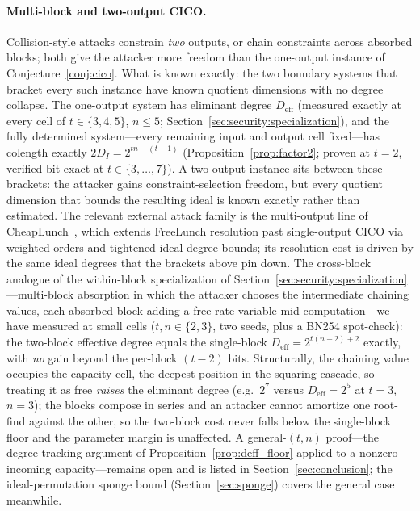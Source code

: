 \documentclass[11pt,a4paper]{article}
\theoremstyle{definition}
\begin{document}
\paragraph{Multi-block and two-output CICO.}
Collision-style attacks constrain \emph{two} outputs, or chain
constraints across absorbed blocks; both give the attacker more
freedom than the one-output instance of Conjecture~\ref{conj:cico}.
What is known exactly: the two boundary systems that bracket every
such instance have known quotient dimensions with no degree collapse.
The one-output system has eliminant degree $D_{\mathrm{eff}}$
(measured exactly at every cell of $t \in \{3,4,5\}$, $n \le 5$;
Section~\ref{sec:security:specialization}), and the fully determined
system---every remaining input and output cell fixed---has colength
exactly $2 D_I = 2^{tn-(t-1)}$ (Proposition~\ref{prop:factor2};
proven at $t=2$, verified bit-exact at $t \in \{3, \ldots, 7\}$). A
two-output instance sits between these brackets: the attacker gains
constraint-selection freedom, but every quotient dimension that
bounds the resulting ideal is known exactly rather than estimated.
The relevant external attack family is the multi-output line of
CheapLunch~\cite{CheapLunch}, which extends FreeLunch resolution past
single-output CICO via weighted orders and tightened ideal-degree
bounds; its resolution cost is driven by the same ideal degrees that
the brackets above pin down. The cross-block analogue of the
within-block specialization of
Section~\ref{sec:security:specialization}---multi-block absorption in
which the attacker chooses the intermediate chaining values, each
absorbed block adding a free rate variable mid-computation---we have
measured at small cells ($t, n \in \{2, 3\}$, two seeds,
plus a BN254 spot-check): the two-block effective degree equals the
single-block $D_{\mathrm{eff}} = 2^{t(n-2)+2}$ exactly, with
\emph{no} gain beyond the per-block $(t-2)$ bits. Structurally, the
chaining value occupies the capacity cell, the deepest position in the
squaring cascade, so treating it as free \emph{raises} the eliminant
degree (e.g.\ $2^{7}$ versus $D_{\mathrm{eff}} = 2^{5}$ at $t=3$,
$n=3$); the blocks compose in series and an attacker cannot amortize
one root-find against the other, so the two-block cost never falls
below the single-block floor and the parameter margin is unaffected.
A general-$(t,n)$ proof---the degree-tracking argument of
Proposition~\ref{prop:deff_floor} applied to a nonzero incoming
capacity---remains open and is listed in
Section~\ref{sec:conclusion}; the ideal-permutation sponge bound
(Section~\ref{sec:sponge}) covers the general case meanwhile.
\end{document}
